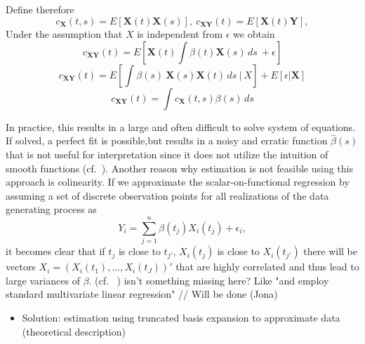 \documentclass[11pt,twoside,a4paper]{article}
\begin{document}
    Define therefore
    \begin{equation}
  	c_{\mathbf{X}}(t,s) = E[\mathbf{X}(t)\mathbf{X}(s)],\: c_{\mathbf{X}\mathbf{Y}}(t) = E[\mathbf{X}(t)\mathbf{Y}], 
    \end{equation}
   Under the assumption that $X$ is independent from $\epsilon$ we obtain
   \begin{equation}
     c_{\mathbf{X}\mathbf{Y}}(t) = E[\mathbf{X}(t)\int \beta(t)\mathbf{X}(s) \,ds \ +\epsilon]
   \end{equation}
    \begin{equation}
     c_{\mathbf{X}\mathbf{Y}}(t) = E[\int \beta(s) \: \mathbf{X}(s)\mathbf{X}(t) \, ds \: | \: X]  + E[\epsilon |\mathbf{X}]
  	\end{equation}
   	\begin{equation}
    	c_{\mathbf{X}\mathbf{Y}}(t) = \int c_{\mathbf{X}}(t,s) \beta(s) \,ds
   \end{equation}
   
   In practice, this results in a large and often difficult to solve system of equations. If solved, a  perfect fit is possible,but results in a noisy and erratic function $\hat{\beta}(s)$ that is not useful for interpretation since it does not utilize the intuition of smooth functions (cf.~\cite{horvath_inference_2012}). Another reason why estimation is not feasible using this approach is colinearity.
   If we approximate the scalar-on-functional regression by assuming a set of discrete observation points for all realizations of the data generating process as
  	\begin{equation}
     Y_i = \sum_{j = 1}^{n} \beta(t_{j})X_i(t_{j}) + \epsilon_{i},
    \end{equation} it becomes clear that if $t_{j}$ is close to $t_{j'}$, $X_{i}(t_{j})$ is close to $X_{i}(t_{j'})$ there will be vectors $X_{i} = (X_i(t_1), \dots, X_i(t_J))'$ that are highly correlated and thus lead to large variances of $\beta$. (cf. ~\cite{kokoszka_introduction_2017}) {\color{red} isn't something missing here? Like "and employ standard multivariate linear regression" // Will be done (Jona)}
   
    
	
   	
	\begin{itemize}
		\item Solution: estimation using truncated basis expansion to approximate data (theoretical description)
	\end{itemize}
	
\end{document}
